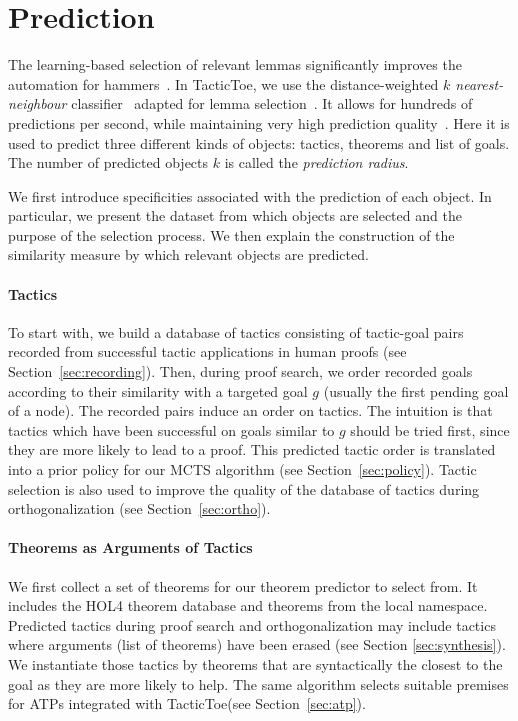 \documentclass[runningheads,a4paper,draft]{svjour3}
\def\holfour{\textsf{HOL4}\xspace}
\def\tactictoe{\textsf{TacticToe}\xspace}
\begin{document}
\section{Prediction}\label{s:prediction}
The learning-based selection of relevant lemmas significantly improves the
automation for hammers~\cite{BlanchetteGKKU16}. In \tactictoe, we use the
distance-weighted \emph{$k$ nearest-neighbour} classifier~\cite{DudaniS76}
adapted for lemma selection~\cite{ckju-pxtp13}. It allows for hundreds of
predictions per second, while maintaining very high prediction quality~\cite{femalecop}.
Here it is used
to predict three different kinds of objects:
 tactics, theorems and list of goals. The number of predicted objects $k$ is
 called the \emph{prediction radius}.

We first introduce specificities associated with the prediction of each object.
In particular, we present the dataset from which objects are selected and the
purpose of the selection process.
We then explain the construction of the similarity measure by which relevant
objects are predicted.

\paragraph{Tactics}
To start with, we build a database of tactics consisting
of tactic-goal pairs recorded from successful tactic applications in human
proofs (see
Section~\ref{sec:recording}).
Then, during proof search, we order recorded goals according to their
similarity with a targeted goal $g$ (usually the first pending goal of a node).
The recorded pairs induce an
order on tactics. The intuition is that tactics which have been successful on
goals similar to $g$ should be tried first, since they are more likely to lead
to a proof.
This predicted tactic order is translated into a prior policy for our MCTS
algorithm (see Section~\ref{sec:policy}).
Tactic selection is also used to improve the quality of the database
of tactics during orthogonalization (see Section~\ref{sec:ortho}).

\paragraph{Theorems as Arguments of Tactics}
We first collect a set of theorems for our theorem predictor to select from.
It includes the \holfour theorem database and theorems from the local namespace.
Predicted tactics during proof search and orthogonalization may include
tactics where arguments (list of theorems) have been erased (see Section
\ref{sec:synthesis}).
We instantiate those tactics by theorems that are syntactically the closest to
the goal as they are more likely to help.
The same algorithm selects suitable premises for ATPs integrated with
\tactictoe (see Section~\ref{sec:atp}).
\end{document}
